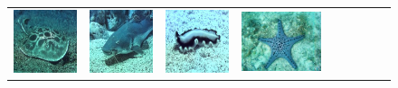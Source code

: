 \begin{figure}[ht]
\begin{center}
\begin{tabular}{ccccccccc}
            \includegraphics[width = 0.10\linewidth, height=0.10\linewidth]{figures/ch3/compare/discussion/SOD/original/5.JPEG}  & \hspace{-0.43cm} 
            \includegraphics[width = 0.10\linewidth, height=0.10\linewidth]{figures/ch3/compare/discussion/SOD/original/6.jpg}  & \hspace{-0.43cm}
            \includegraphics[width = 0.10\linewidth, height=0.10\linewidth]{figures/ch3/compare/discussion/SOD/original/7.JPEG}  & \hspace{-0.43cm}
            \includegraphics[width = 0.10\linewidth, height=0.10\linewidth]{figures/ch3/compare/discussion/SOD/original/9.jpg} \\
            

\end{tabular}
\end{center}
\end{figure}
